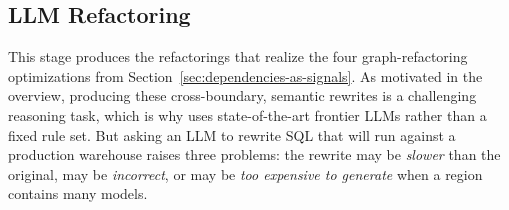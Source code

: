 


\subsection{LLM Refactoring}
\label{sec:llm-refactoring}

This stage produces the refactorings that realize the four graph-refactoring optimizations from Section~\ref{sec:dependencies-as-signals}. As motivated in the overview, producing these cross-boundary, semantic rewrites is a challenging reasoning task, which is why \tool{} uses state-of-the-art frontier LLMs rather than a fixed rule set.
But asking an LLM to rewrite SQL that will run against a production warehouse raises three problems: the rewrite may be \emph{slower} than the original, may be \emph{incorrect}, or may be \emph{too expensive to generate} when a region contains many models.





